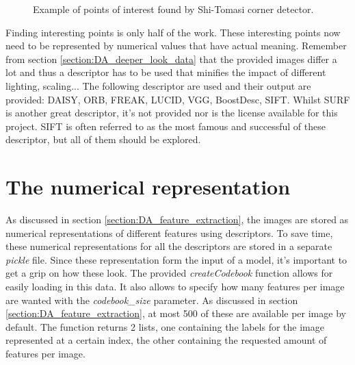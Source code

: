\begin{figure}[H]
    \centering
    \captionsetup{width=0.7\linewidth}
    \captionsetup{justification=centering}
    \caption{Example of points of interest found by Shi-Tomasi corner detector.}
    \label{fig:1-data_analysis-POI}
\end{figure}

Finding interesting points is only half of the work.
These interesting points now need to be represented by numerical values that have actual meaning.
Remember from section \ref{section:DA_deeper_look_data} that the provided images differ a lot and thus a descriptor has to be used that minifies the impact of different lighting, scaling...
The following descriptor are used and their output are provided: DAISY, ORB, FREAK, LUCID, VGG, BoostDesc, SIFT.
Whilst SURF is another great descriptor, it's not provided nor is the license available for this project.
SIFT is often referred to as the most famous and successful of these descriptor, but all of them should be explored.



\section{The numerical representation}
\label{section:DA_numerical_representation}

As discussed in section \ref{section:DA_feature_extraction}, the images are stored as numerical representations of different features using descriptors.
To save time, these numerical representations for all the descriptors are stored in a separate \emph{pickle} file.
Since these representation form the input of a model, it's important to get a grip on how these look.
The provided \emph{createCodebook} function allows for easily loading in this data.
It also allows to specify how many features per image are wanted with the \emph{codebook\_size} parameter.
As discussed in section \ref{section:DA_feature_extraction}, at most 500 of these are available per image by default.
The function returns 2 lists, one containing the labels for the image represented at a certain index, the other containing the requested amount of features per image. 

